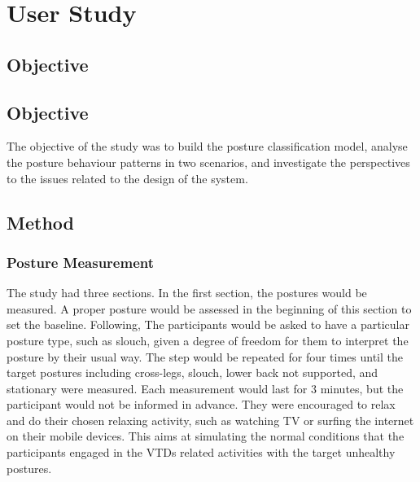 \chapter{User Study}

\section{Objective}
\section{Objective}
The objective of the study was to build the posture classification model, analyse the posture behaviour patterns in two scenarios, and investigate the perspectives to the issues related to the design of the system.

\section{Method}
\subsection{Posture Measurement}
The study had three sections. In the first section, the postures would be measured. A proper posture would be assessed in the beginning of this section to set the baseline. Following, The participants would be asked to have a particular posture type, such as slouch, given a degree of freedom for them to interpret the posture by their usual way. The step would be repeated for four times until the target postures including cross-legs, slouch, lower back not supported, and stationary were measured. Each measurement would last for 3 minutes, but the participant would not be informed in advance. They were encouraged to relax and do their chosen relaxing activity, such as watching TV or surfing the internet on their mobile devices. This aims at simulating the normal conditions that the participants engaged in the VTDs related activities with the target unhealthy postures.

